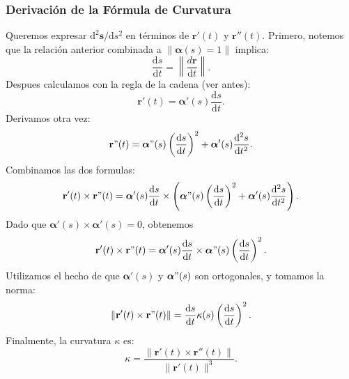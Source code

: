 \documentclass[11pt]{book}
\theoremstyle{definicion}
\theoremstyle{teorema}
\theoremstyle{ejemplo}
\begin{document}
\subsubsection{Derivación de la Fórmula de Curvatura}

Queremos expresar ${\mathrm{d}^2 \boldsymbol{s}}/{\mathrm{d}s^2}$ en términos de %
$\mathbf{r}'(t)$ y $\mathbf{r}''(t)$. Primero, notemos que la relación anterior combinada a $\| \boldsymbol{\alpha}(s)=1\|$ implica:
\begin{equation*}
\frac{\mathrm{d}s}{\mathrm{d}t} = \left\| \frac{d\mathbf{r}}{\mathrm{d}t} \right\|.
\end{equation*}
Despues calculamos con la regla de la cadena (ver antes):
\[
\mathbf{r}'(t) = \boldsymbol{\alpha}'(s) \frac{\mathrm{d}s}{\mathrm{d}t}.
\]
Derivamos otra vez:
\[
\mathbf{r}"(t) = 
\boldsymbol{\alpha}"(s) \left ( \frac{\mathrm{d}s}{\mathrm{d}t} \right )^2
+
\boldsymbol{\alpha}'(s) \frac{\mathrm{d}^2s}{\mathrm{d}t^2}.
\]
Combinamos las dos formulas:
\[
\mathbf{r}'(t) \times \mathbf{r}"(t) 
= \boldsymbol{\alpha}'(s) \frac{\mathrm{d}s}{\mathrm{d}t} \times
\left (
\boldsymbol{\alpha}"(s) \left ( \frac{\mathrm{d}s}{\mathrm{d}t} \right )^2
+
\boldsymbol{\alpha}'(s) \frac{\mathrm{d}^2s}{\mathrm{d}t^2} \right ).
\]
Dado que \( \boldsymbol{\alpha}'(s) \times \boldsymbol{\alpha}'(s) = 0\), obtenemos
\[
\mathbf{r}'(t) \times \mathbf{r}"(t) 
= \boldsymbol{\alpha}'(s) \frac{\mathrm{d}s}{\mathrm{d}t} \times
\boldsymbol{\alpha}"(s) \left ( \frac{\mathrm{d}s}{\mathrm{d}t} \right )^2.
\]
Utilizamos el hecho de que $\boldsymbol{\alpha}'(s)$ y $\boldsymbol{\alpha}"(s)$ son ortogonales, y tomamos la norma:
\[
\| \mathbf{r}'(t) \times \mathbf{r}"(t) \|
= \frac{\mathrm{d}s}{\mathrm{d}t} 
\kappa(s) \left ( \frac{\mathrm{d}s}{\mathrm{d}t} \right )^2.
\]
%
%
%
%
%
%
Finalmente, la curvatura $\kappa$ es:
\begin{equation*}
\kappa %
= \frac{\|\mathbf{r}'(t) \times \mathbf{r}''(t)\|}{\|\mathbf{r}'(t)\|^3}.
\end{equation*}
\end{document}
